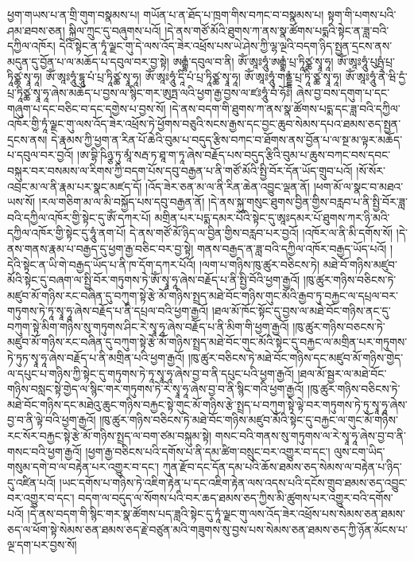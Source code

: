 ཕྱག་གཡས་པ་ན་གྲི་གུག་བསྣམས་པ། གཡོན་པ་ན་ཐོད་པ་ཁྲག་གིས་བཀང་བ་བསྣམས་པ། སྟག་གི་པགས་པའི་ཤམ་ཐབས་ཅན། སྐྱིལ་ཀྲུང་དུ་བཞུགས་པའོ། །དེ་ནས་གཙོ་མོའི་ཐུགས་ཀ་ནས་སྣ་ཚོགས་པདྨའི་སྟེང་ན་ཟླ་བའི་དཀྱིལ་འཁོར། དེའི་སྟེང་ན་ཏཱཾ་ལྗང་གུ་དེ་ལས་འོད་ཟེར་འཕྲོས་པས་ཡེ་ཤེས་ཀྱི་ལྷ་ལྔའི་བདག་ཉིད་སྤྱན་དྲངས་ནས་མདུན་དུ་བྱོན་པ་ལ་མཆོད་པ་དབུལ་བར་བྱ་སྟེ། ཨརྒྷཾ་དབུལ་བ་ནི། ཨོཾ་ཨཱཿཧཱུཾ་ཨརྒྷཾ་པྲ་ཏཱིཙྪ་སྭཱ་ཧཱ། ཨོཾ་ཨཱཿཧཱུཾ་པུཥྤཾ་པྲ་ཏཱིཙྪ་སྭཱ་ཧཱ། ཨོཾ་ཨཱཿཧཱུཾ་དྷཱུ་པཾ་པྲ་ཏཱིཙྪ་སྭཱ་ཧཱ། ཨོཾ་ཨཱཿཧཱུཾ་དཱི་པཾ་པྲ་ཏཱིཙྪ་སྭཱ་ཧཱ། ཨོཾ་ཨཱཿཧཱུཾ་གནྡྷཾ་པྲ་ཏཱི་ཙྪ་སྭཱ་ཧཱ། ཨོཾ་ཨཱཿཧཱུཾ་ནཻ་ཝི་དྱཾ་པྲ་ཏཱིཙྪ་སྭཱ་ཧཱ་ཞེས་མཆོད་པ་བྱས་ལ་སྙིང་གར་ཨུཏྤ་ལའི་ཕྱག་རྒྱ་བྱས་ལ་ཛཿཧཱུཾ་བཾ་ཧོཿ། ཞེས་བྱ་བས་དགུག་པ་དང་གཞུག་པ་དང་བཅིང་བ་དང་དགྱེས་པ་བྱས་སོ། །དེ་ནས་བདག་གི་ཐུགས་ཀ་ནས་སྣ་ཚོགས་པདྨ་དང་ཟླ་བའི་དཀྱིལ་འཁོར་གྱི་ཏཱཾ་ལྗང་གུ་ལས་འོད་ཟེར་འཕྲོས་ཏེ་ཕྱོགས་བཅུའི་སངས་རྒྱས་དང་བྱང་ཆུབ་སེམས་དཔའ་ཐམས་ཅད་སྤྱན་དྲངས་ནས། དེ་རྣམས་ཀྱི་ཕྱག་ན་རིན་པོ་ཆེའི་བུམ་པ་བདུད་རྩིས་བཀང་བ་ཐོགས་ནས་བྱོན་པ་ལ་སྔ་མ་ལྟར་མཆོད་པ་དབུལ་བར་བྱའོ། །ཨ་བྷི་ཥིཉྩ་ཏུ་མཱཾ་སརྦ་ཏ་ཐཱ་ག་ཏཱ་ཞེས་བརྗོད་པས་བདུད་རྩིའི་བུམ་པ་ཆུས་བཀང་བས་དབང་བསྐུར་བར་བསམས་ལ་རིགས་ཀྱི་བདག་པོས་དབུ་བརྒྱན་པ་ནི་གཙོ་མོའི་སྤྱི་བོར་དོན་ཡོད་གྲུབ་པའོ། །སོ་སོར་འབྲང་མ་ལ་ནི་རྣམ་པར་སྣང་མཛད་དོ། །འོད་ཟེར་ཅན་མ་ལ་ནི་རིན་ཆེན་འབྱུང་ལྡན་ནོ། །ཕག་མོ་ལ་སྣང་བ་མཐའ་ཡས་སོ། །རལ་གཅིག་མ་ལ་མི་བསྐྱོད་པས་དབུ་བརྒྱན་ནོ། །དེ་ནས་སྐུ་གསུང་ཐུགས་བྱིན་གྱིས་བརླབ་པ་ནི་སྤྱི་བོར་ཟླ་བའི་དཀྱིལ་འཁོར་གྱི་སྟེང་དུ་ཨོཾ་དཀར་པོ། མགྲིན་པར་པདྨ་དམར་པོའི་སྟེང་དུ་ཨཱཿདམར་པོ་ཐུགས་ཀར་ཉི་མའི་དཀྱིལ་འཁོར་གྱི་སྟེང་དུ་ཧཱུཾ་ནག་པོ། དེ་ནས་གཙོ་མོ་ཉིད་ལ་བྱིན་གྱིས་བརླབ་པར་བྱའོ། །འཁོར་ལ་ནི་མི་དགོས་སོ། །དེ་ནས་གནས་རྣམ་པ་བརྒྱད་དུ་ཕྱག་རྒྱ་བཅིང་བར་བྱ་སྟེ། གནས་བརྒྱད་ན་ཟླ་བའི་དཀྱིལ་འཁོར་བརྒྱད་ཡོད་པའོ། །དེའི་སྟེང་ན་ཡི་གེ་བརྒྱད་ཡོད་པ་ནི་ཁ་དོག་དཀར་པོའོ། །ལག་པ་གཉིས་ཁུ་ཚུར་བཅིངས་ཏེ། མཐེ་བོ་གཉིས་མཛུབ་མོའི་སྟེང་དུ་བཞག་ལ་སྤྱི་བོར་གཏུགས་ཏེ་ཨོཾ་སྭཱ་ཧཱ་ཞེས་བརྗོད་པ་ནི་སྤྱི་བོའི་ཕྱག་རྒྱའོ། །ཁུ་ཚུར་གཉིས་བཅིངས་ཏེ་མཛུབ་མོ་གཉིས་རང་བཞིན་དུ་བཀུག་སྟེ་རྩེ་མོ་གཉིས་སྤྲད་མཐེ་བོང་གཉིས་གུང་མོའི་རྒྱབ་ཏུ་བརྐྱང་ལ་དཔྲལ་བར་གཏུགས་ཏེ་ཏཱ་སྭཱ་ཧཱ་ཞེས་བརྗོད་པ་ནི་དཔྲལ་བའི་ཕྱག་རྒྱའོ། །ཐལ་མོ་ཁོང་སྟོང་དུ་བྱས་ལ་མཐེ་བོང་གཉིས་ནང་དུ་བཀུག་སྟེ་མིག་གཉིས་སུ་གཏུགས་ཤིང་རེ་སྭཱ་ཧཱ་ཞེས་བརྗོད་པ་ནི་མིག་གི་ཕྱག་རྒྱའོ། །ཁུ་ཚུར་གཉིས་བཅངས་ཏེ་མཛུབ་མོ་གཉིས་རང་བཞིན་དུ་བཀུག་སྟེ་རྩེ་མོ་གཉིས་སྤྲད་མཐེ་བོང་གུང་མོའི་སྟེང་དུ་བརྐྱང་ལ་མགྲིན་པར་གཏུགས་ཏེ་ཏུཏ་སྭཱ་ཧཱ་ཞེས་བརྗོད་པ་ནི་མགྲིན་པའི་ཕྱག་རྒྱའོ། །ཁུ་ཚུར་བཅིངས་ཏེ་མཐེ་བོང་གཉིས་དང་མཛུབ་མོ་གཉིས་གྱེད་ལ་དཔུང་པ་གཉིས་ཀྱི་སྟེང་དུ་གཏུགས་ཏེ་ཏཱ་སྭཱ་ཧཱ་ཞེས་བྱ་བ་ནི་དཔུང་པའི་ཕྱག་རྒྱའོ། །ཐལ་མོ་སྦྱར་ལ་མཐེ་བོང་གཉིས་བསླང་སྟེ་གྱེད་ལ་སྙིང་གར་གཏུགས་ཏེ་རེ་སྭཱ་ཧཱ་ཞེས་བྱ་བ་ནི་སྙིང་གའི་ཕྱག་རྒྱའོ། །ཁུ་ཚུར་གཉིས་བཅིངས་ཏེ་མཐེ་བོང་གཉིས་དང་མཐེའུ་ཆུང་གཉིས་བརྐྱང་སྟེ་གུང་མོ་གཉིས་རྩེ་སྤྲད་པ་བཀུག་སྟེ་ལྟེ་བར་གཏུགས་ཏེ་ཏུ་སྭཱ་ཧཱ་ཞེས་བྱ་བ་ནི་ལྟེ་བའི་ཕྱག་རྒྱའོ། །ཁུ་ཚུར་གཉིས་བཅིངས་ཏེ་མཐེ་བོང་གཉིས་མཛུབ་མོའི་སྟེང་དུ་བརྐྱང་ལ་གུང་མོ་གཉིས་རང་སོར་བརྐྱང་སྟེ་རྩེ་མོ་གཉིས་སྤྲད་ལ་བག་ཙམ་བསྐུམ་སྟེ། གསང་བའི་གནས་སུ་གཏུགས་ལ་རེ་སྭཱ་ཧཱ་ཞེས་བྱ་བ་ནི་གསང་བའི་ཕྱག་རྒྱའོ། །ཕྱག་རྒྱ་བཅིངས་པའི་དགོས་པ་ནི་དམ་ཚིག་བསྲུང་བར་འགྱུར་བ་དང་། ལུས་ངག་ཡིད་གསུམ་དགེ་བ་ལ་བརྟེན་པར་འགྱུར་བ་དང་། ཀུན་རྫོབ་དང་དོན་དམ་པའི་ཆོས་ཐམས་ཅད་སེམས་ལ་བརྟེན་པ་ཉིད་དུ་འཛིན་པའོ། །ཡང་དགོས་པ་གཉིས་ཏེ་འཇིག་རྟེན་པ་དང་འཇིག་རྟེན་ལས་འདས་པའི་དངོས་གྲུབ་ཐམས་ཅད་འབྱུང་བར་འགྱུར་བ་དང་། བདག་ལ་བདུད་ལ་སོགས་པའི་བར་ཆད་ཐམས་ཅད་ཀྱིས་མི་ཚུགས་པར་འགྱུར་བའི་དགོས་པའོ། །དེ་ནས་བདག་གི་སྙིང་གར་སྣ་ཚོགས་པད་ཟླའི་སྟེང་དུ་ཏཱཾ་ལྗང་གུ་ལས་འོད་ཟེར་འཕྲོས་པས་སེམས་ཅན་ཐམས་ཅད་ལ་ཕོག་སྟེ་སེམས་ཅན་ཐམས་ཅད་རྗེ་བཙུན་མའི་གཟུགས་སུ་བྱས་པས་སེམས་ཅན་ཐམས་ཅད་ཀྱི་ཉོན་མོངས་པ་ལྔ་དག་པར་བྱས་སོ། 